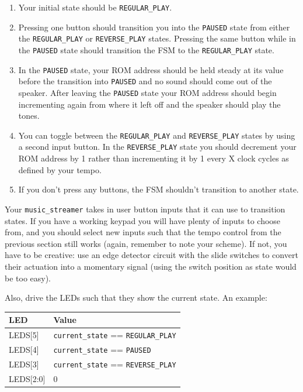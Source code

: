 \documentclass[11pt]{article}
\begin{document}
\begin{enumerate}
	\item Your initial state should be \verb|REGULAR_PLAY|. 
	
	\item Pressing one button should transition you into the \verb|PAUSED| state from either the \verb|REGULAR_PLAY| or \verb|REVERSE_PLAY| states. Pressing the same button while in the \verb|PAUSED| state should transition the FSM to the \verb|REGULAR_PLAY| state.
	
	\item In the \verb|PAUSED| state, your ROM address should be held steady at its value before the transition into \verb|PAUSED| and no sound should come out of the speaker. After leaving the \verb|PAUSED| state your ROM address should begin incrementing again from where it left off and the speaker should play the tones.
	
	\item You can toggle between the \verb|REGULAR_PLAY| and \verb|REVERSE_PLAY| states by using a second input button. In the \verb|REVERSE_PLAY| state you should decrement your ROM address by 1 rather than incrementing it by 1 every X clock cycles as defined by your tempo.
		
	\item If you don't press any buttons, the FSM shouldn't transition to another state.
\end{enumerate}

Your \verb|music_streamer| takes in user button inputs that it can use to transition states. If you have a working keypad you will have plenty of inputs to choose from, and you should select new inputs such that the tempo control from the previous section still works (again, remember to note your scheme). If not, you have to be creative: use an edge detector circuit with the slide switches to convert their actuation into a momentary signal (using the switch position as state would be too easy).

Also, drive the LEDs such that they show the current state. An example:

\renewcommand{\arraystretch}{1.5}
\begin{center}
\begin{tabular}{| l | l |}
	\hline
	\textbf{LED} & \textbf{Value} \\ \hline
        LEDS[5] & \verb|current_state| == \verb|REGULAR_PLAY| \\ \hline
        LEDS[4] & \verb|current_state| == \verb|PAUSED| \\ \hline
        LEDS[3] & \verb|current_state| == \verb|REVERSE_PLAY| \\ \hline
        LEDS[2:0] & 0 \\ \hline
\end{tabular}
\end{center}
\end{document}
